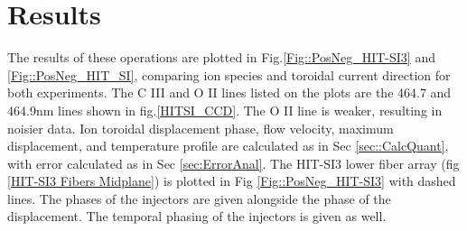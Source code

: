 \documentclass{AIAA}
\begin{document}

\section{Results}
\hspace{4ex}The results of these operations are plotted in Fig.\ref{Fig::PosNeg_HIT-SI3} and \ref{Fig::PosNeg_HIT_SI}, comparing ion species and toroidal current direction for both experiments. The C III and O II lines listed on the plots are the 464.7 and 464.9nm lines shown in fig.\ref{HITSI_CCD}. The O II line is weaker, resulting in noisier data. Ion toroidal displacement phase, flow velocity, maximum displacement, and temperature profile are calculated as in Sec \ref{sec::CalcQuant}, with error calculated as in Sec \ref{sec:ErrorAnal}. The HIT-SI3 lower fiber array (fig \ref{HIT-SI3 Fibers Midplane}) is plotted in Fig \ref{Fig::PosNeg_HIT-SI3} with dashed lines. The phases of the injectors are given alongside the phase of the displacement. The temporal phasing of the injectors is given as well.
\end{document}
